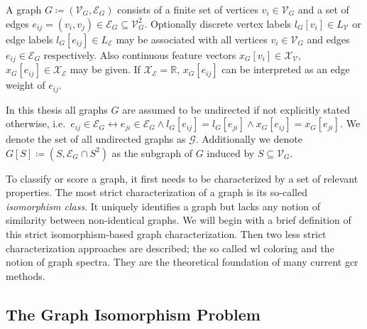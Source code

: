 \begin{defn}
	A graph $G \coloneqq (\mathcal{V}_G, \mathcal{E}_G)$ consists of a finite set of vertices $v_i \in \mathcal{V}_G$ and a set of edges $e_{ij} = (v_i, v_j) \in \mathcal{E}_G \subseteq \mathcal{V}_G^2$.
	Optionally discrete vertex labels $l_G[v_i] \in L_{\mathcal{V}}$ or edge labels $l_G[e_{ij}] \in L_{\mathcal{E}}$ may be associated with all vertices $v_i \in \mathcal{V}_G$ and edges $e_{ij}\in \mathcal{E}_G$ respectively.
	Also continuous feature vectors $x_G[v_{i}] \in \mathcal{X}_{\mathcal{V}}$, $x_G[e_{ij}] \in \mathcal{X}_{\mathcal{E}}$ may be given.
	If $\mathcal{X}_{\mathcal{E}} = \mathbb{R}$, $x_G[e_{ij}]$ can be interpreted as an edge weight of $e_{ij}$.

	In this thesis all graphs $G$ are assumed to be undirected if not explicitly stated otherwise, i.e.\ ${e_{ij} \in \mathcal{E}_G} \leftrightarrow\allowbreak {e_{ji} \in \mathcal{E}_G} \allowbreak\land l_G[e_{ij}] = l_G[e_{ji}] \allowbreak\land x_G[e_{ij}] = x_G[e_{ji}]$.
	We denote the set of all undirected graphs as $\mathcal{G}$.
	Additionally we denote $G[S] \coloneqq (S, \mathcal{E}_G \cap S^2)$ as the subgraph of $G$ induced by $S \subseteq \mathcal{V}_G$.
\end{defn}
To classify or score a graph, it first needs to be characterized by a set of relevant properties.
The most strict characterization of a graph is its so-called \textit{isomorphism class}.
It uniquely identifies a graph but lacks any notion of similarity between non-identical graphs.
We will begin with a brief definition of this strict isomorphism-based graph characterization.
Then two less strict characterization approaches are described; the so called \acl{wl} coloring and the notion of graph spectra.
They are the theoretical foundation of many current \ac{gcr} methods.

\subsection{The Graph Isomorphism Problem}%
\label{sec:related:character:iso}

